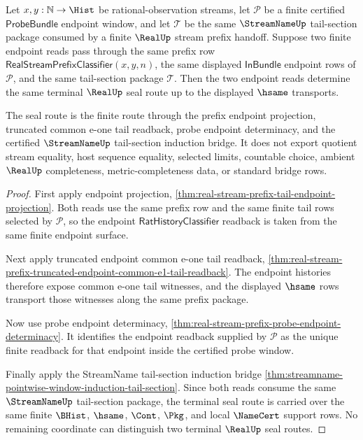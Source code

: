 \begin{theorem}
\label{thm:real-terminal-seal-tail-section-coherence}
Let $x,y:\mathbb{N}\to\Hist$ be rational-observation streams, let
$\mathcal P$ be a finite certified $\mathsf{ProbeBundle}$ endpoint window, and
let $\mathcal T$ be the same $\StreamNameUp$ tail-section package consumed by a
finite $\RealUp$ stream prefix handoff. Suppose two finite endpoint reads pass
through the same prefix row $\mathsf{RealStreamPrefixClassifier}(x,y,n)$, the
same displayed $\mathsf{InBundle}$ endpoint rows of $\mathcal P$, and the same
tail-section package $\mathcal T$. Then the two endpoint reads determine the
same terminal $\RealUp$ seal route up to the displayed $\hsame$ transports.

The seal route is the finite route through the prefix endpoint projection,
truncated common e-one tail readback, probe endpoint determinacy, and the
certified $\StreamNameUp$ tail-section induction bridge. It does not export
quotient stream equality, host sequence equality, selected limits, countable
choice, ambient $\RealUp$ completeness, metric-completeness data, or standard
bridge rows.
\end{theorem}
\begin{proof}
First apply endpoint projection,
\autoref{thm:real-stream-prefix-tail-endpoint-projection}. Both reads use the
same prefix row and the same finite tail rows selected by $\mathcal P$, so the
endpoint $\mathsf{RatHistoryClassifier}$ readback is taken from the same
finite endpoint surface.

Next apply truncated endpoint common e-one tail readback,
\autoref{thm:real-stream-prefix-truncated-endpoint-common-e1-tail-readback}.
The endpoint histories therefore expose common e-one tail witnesses, and the
displayed $\hsame$ rows transport those witnesses along the same prefix
package.

Now use probe endpoint determinacy,
\autoref{thm:real-stream-prefix-probe-endpoint-determinacy}. It identifies the
endpoint readback supplied by $\mathcal P$ as the unique finite readback for
that endpoint inside the certified probe window.

Finally apply the StreamName tail-section induction bridge
\autoref{thm:streamname-pointwise-window-induction-tail-section}. Since both
reads consume the same $\StreamNameUp$ tail-section package, the terminal seal
route is carried over the same finite $\BHist$, $\hsame$, $\Cont$, $\Pkg$, and
local $\NameCert$ support rows. No remaining coordinate can distinguish two
terminal $\RealUp$ seal routes.
\end{proof}

